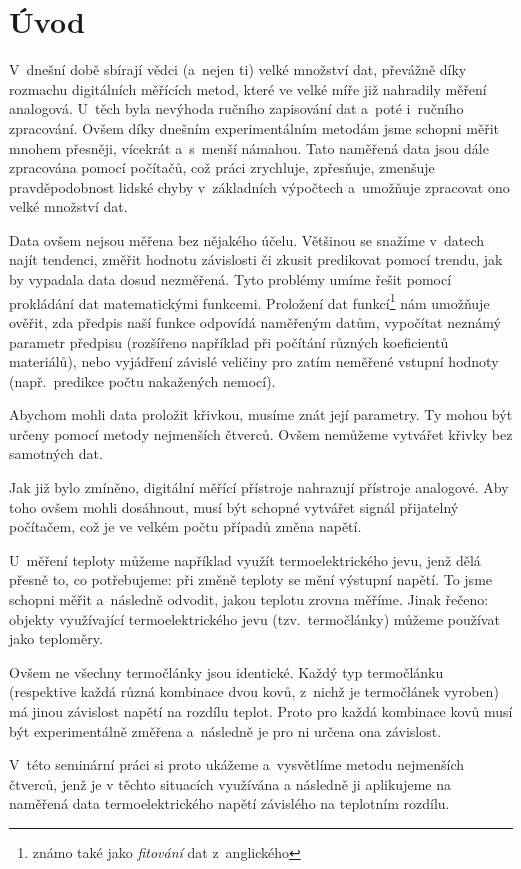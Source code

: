 \section{Úvod}
V~dnešní době sbírají vědci (a~nejen ti) velké množství dat, převážně díky
rozmachu digitálních měřících metod, které ve velké míře již nahradily měření
analogová. U~těch byla nevýhoda ručního zapisování dat a~poté i~ručního
zpracování. Ovšem díky dnešním experimentálním metodám jsme schopni měřit
mnohem přesněji, vícekrát a~s~menší námahou. Tato naměřená data jsou dále
zpracována pomocí počítačů, což práci zrychluje, zpřesňuje, zmenšuje
pravděpodobnost lidské chyby v~základních výpočtech a~umožňuje zpracovat ono
velké množství dat.

Data ovšem nejsou měřena bez nějakého účelu. Většinou se snažíme v~datech najít
tendenci, změřit hodnotu závislosti či zkusit predikovat pomocí trendu,
jak by vypadala data dosud nezměřená. Tyto problémy umíme řešit pomocí
prokládání dat matematickými funkcemi. Proložení dat funkcí\footnote{známo také
jako \emph{fitování} dat z~anglického } nám umožňuje ověřit, zda
předpis naší funkce odpovídá naměřeným datům, vypočítat neznámý parametr
předpisu (rozšířeno například při počítání různých koeficientů materiálů), nebo
vyjádření závislé veličiny pro zatím neměřené vstupní hodnoty (např.~predikce
počtu nakažených nemocí).

Abychom mohli data proložit křivkou, musíme znát její parametry. Ty mohou být
určeny pomocí metody nejmenších čtverců. Ovšem nemůžeme vytvářet křivky bez
samotných dat.

Jak již bylo zmíněno, digitální měřící přístroje nahrazují přístroje analogové.
Aby toho ovšem mohli dosáhnout, musí být schopné vytvářet signál přijatelný
počítačem, což je ve velkém počtu případů změna napětí. 

U~měření teploty můžeme například využít termoelektrického jevu, jenž dělá
přesně to, co potřebujeme: při změně teploty se mění výstupní napětí. To jsme
schopni měřit a~následně odvodit, jakou teplotu zrovna měříme. Jinak řečeno:
objekty využívající termoelektrického jevu (tzv.~termočlánky) můžeme používat
jako teploměry.

Ovšem ne všechny termočlánky jsou identické. Každý typ termočlánku (respektive
každá různá kombinace dvou kovů, z~nichž je termočlánek vyroben) má jinou
závislost napětí na rozdílu teplot. Proto pro každá kombinace kovů musí být
experimentálně změřena a~následně je pro ni určena ona závislost.

V~této seminární práci si proto ukážeme a~vysvětlíme metodu nejmenších čtverců,
jenž je v těchto situacích využívána a následně ji aplikujeme na naměřená data
termoelektrického napětí závislého na teplotním rozdílu.
